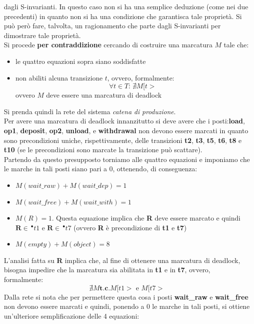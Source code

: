 \documentclass[a4paper,12pt, oneside]{book}
\begin{document}
\begin{esempio}
  dagli S-invarianti. In questo caso non si ha una semplice deduzione (come nei
  due precedenti) in quanto non si ha una condizione che garantisca tale
  proprietà. Si può però fare, talvolta, un ragionamento che parte dagli
  S-invarianti per dimostrare tale proprietà.\\
  Si procede \textbf{per contraddizione} cercando di costruire una marcatura $M$
  tale che:
  \begin{itemize}
    \item le quattro equazioni sopra siano soddisfatte
    \item non abiliti alcuna transizione $t$, ovvero, formalmente:
    \[\forall t\in T:\,\nexists M[t>\]
    ovvero $M$ deve essere una marcatura di deadlock
  \end{itemize}
  Si prenda quindi la rete del sistema \emph{catena di produzione}.
  \\
  Per avere una marcatura di deadlock innanzitutto si deve avere che i
  posti:\textbf{load}, \textbf{op1}, \textbf{deposit}, \textbf{op2},
  \textbf{unload}, e \textbf{withdrawal} non devono essere marcati in quanto
  sono precondizioni uniche, rispettivamente, delle transizioni \textbf{t2},
  \textbf{t3}, \textbf{t5}, \textbf{t6}, \textbf{t8} e \textbf{t10} (se le
  precondizioni sono marcate la transizione può scattare).\\
  Partendo da questo presupposto torniamo alle quattro equazioni e imponiamo che
  le marche in tali posti siano pari a 0, ottenendo, di conseguenza:
  \begin{itemize}
    \item $M(wait\_raw) + M(wait\_dep) = 1$
    \item $M(wait\_free) + M(wait\_with) = 1$
    \item $M(R) = 1$. Questa equazione implica che \textbf{R} deve essere
    marcato e quindi $\mathbf{R}\in \,^\bullet t1$ e $\mathbf{R}\in \,^\bullet
    t7$ (ovvero \textbf{R} è precondizione di \textbf{t1} e \textbf{t7})
    \item $M(empty) + M(object) = 8$
  \end{itemize}
  L'analisi fatta su \textbf{R} implica che, al fine di ottenere una marcatura
  di deadlock, bisogna impedire che la marcatura sia abilitata in \textbf{t1} e
  in \textbf{t7}, ovvero, formalmente:
  \[\nexists M \mathbf{ t.c. } M[t1> \mbox{ e } M[t7>\]
  Dalla rete si nota che per permettere questa cosa i posti \textbf{wait\_raw} e
  \textbf{wait\_free} non devono essere marcati e quindi, ponendo a 0 le marche
  in tali posti, si ottiene un'ulteriore semplificazione delle 4 equazioni:

\end{esempio}
\end{document}
